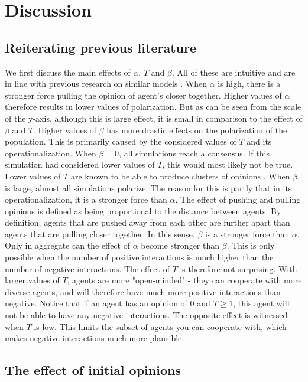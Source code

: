 \documentclass{article}
\begin{document}
\section{Discussion}

\subsection{Reiterating previous literature}

We first discuss the main effects of $\alpha$, $T$ and $\beta$. All of these are intuitive and are in line with previous research on similar models \cite{flache_models_2017}. When $\alpha$ is high, there is a stronger force pulling the opinion of agent's closer together. Higher values of $\alpha$ therefore results in lower values of polarization. But as can be seen from the scale of the y-axis, although this is large effect, it is small in comparison to the effect of $\beta$ and $T$. Higher values of $\beta$ has more drastic effects on the polarization of the population. 
This is primarily caused by the considered values of $T$ and its operationalization. When $\beta = 0$, all simulations reach a consensus. If this simulation had considered lower values of $T$, this would most likely not be true. Lower values of $T$ are known to be able to produce clusters of opinions \cite{flache_models_2017,sasahara_social_2021}. When $\beta$ is large, almost all simulations polarize. The reason for this is partly that in its operationalization, it is a stronger force than $\alpha$. The effect of pushing and pulling opinions is defined as being proportional to the distance between agents. 
By definition, agents that are pushed away from each other are further apart than agents that are pulling closer together. In this sense, $\beta$ is a stronger force than $\alpha$. Only in aggregate can the effect of $\alpha$ become stronger than $\beta$. This is only possible when the number of positive interactions is much higher than the number of negative interactions. The effect of $T$ is therefore not surprising. With larger values of $T$, agents are more "open-minded" - they can cooperate with more diverse agents, and will therefore have much more positive interactions than negative. Notice that if an agent has an opinion of 0 and $T\geq1$, this agent will not be able to have any negative interactions. The opposite effect is witnessed when $T$ is low. This limits the subset of agents you can cooperate with, which makes negative interactions much more plausible.

\subsection{The effect of initial opinions}
\end{document}
